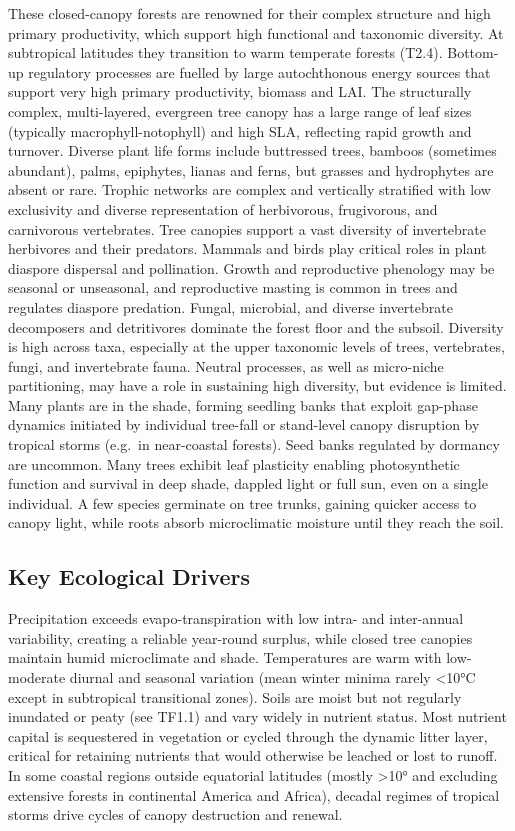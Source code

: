 \documentclass[
  letterpaper,
  DIV=11,
  numbers=noendperiod]{scrartcl}
\begin{document}
These closed-canopy forests are renowned for their complex structure and
high primary productivity, which support high functional and taxonomic
diversity. At subtropical latitudes they transition to warm temperate
forests (T2.4). Bottom-up regulatory processes are fuelled by large
autochthonous energy sources that support very high primary
productivity, biomass and LAI. The structurally complex, multi-layered,
evergreen tree canopy has a large range of leaf sizes (typically
macrophyll-notophyll) and high SLA, reflecting rapid growth and
turnover. Diverse plant life forms include buttressed trees, bamboos
(sometimes abundant), palms, epiphytes, lianas and ferns, but grasses
and hydrophytes are absent or rare. Trophic networks are complex and
vertically stratified with low exclusivity and diverse representation of
herbivorous, frugivorous, and carnivorous vertebrates. Tree canopies
support a vast diversity of invertebrate herbivores and their predators.
Mammals and birds play critical roles in plant diaspore dispersal and
pollination. Growth and reproductive phenology may be seasonal or
unseasonal, and reproductive masting is common in trees and regulates
diaspore predation. Fungal, microbial, and diverse invertebrate
decomposers and detritivores dominate the forest floor and the subsoil.
Diversity is high across taxa, especially at the upper taxonomic levels
of trees, vertebrates, fungi, and invertebrate fauna. Neutral processes,
as well as micro-niche partitioning, may have a role in sustaining high
diversity, but evidence is limited. Many plants are in the shade,
forming seedling banks that exploit gap-phase dynamics initiated by
individual tree-fall or stand-level canopy disruption by tropical storms
(e.g.~in near-coastal forests). Seed banks regulated by dormancy are
uncommon. Many trees exhibit leaf plasticity enabling photosynthetic
function and survival in deep shade, dappled light or full sun, even on
a single individual. A few species germinate on tree trunks, gaining
quicker access to canopy light, while roots absorb microclimatic
moisture until they reach the soil.

\subsection{Key Ecological Drivers}\label{key-ecological-drivers-69}

Precipitation exceeds evapo-transpiration with low intra- and
inter-annual variability, creating a reliable year-round surplus, while
closed tree canopies maintain humid microclimate and shade. Temperatures
are warm with low-moderate diurnal and seasonal variation (mean winter
minima rarely \textless10°C except in subtropical transitional zones).
Soils are moist but not regularly inundated or peaty (see TF1.1) and
vary widely in nutrient status. Most nutrient capital is sequestered in
vegetation or cycled through the dynamic litter layer, critical for
retaining nutrients that would otherwise be leached or lost to runoff.
In some coastal regions outside equatorial latitudes (mostly
\textgreater10° and excluding extensive forests in continental America
and Africa), decadal regimes of tropical storms drive cycles of canopy
destruction and renewal.
\end{document}
